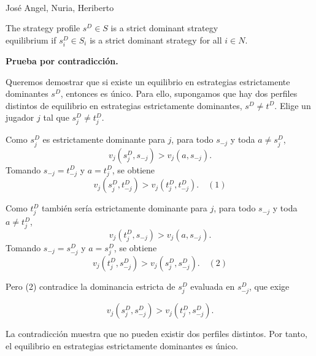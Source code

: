 \documentclass[10pt,a4paper]{article} %
\begin{document}
\thispagestyle{empty}
\vspace*{-5em}
\begin{center}
  \LARGE{}\\
  \vspace{0.5em}
  \scriptsize\textnormal{José Angel, Nuria, Heriberto}
  \vspace{2em}
\end{center}

\begin{center}
  The strategy profile $s^{D}\in S$ is a strict dominant strategy\\ equilibrium if $s_i^{D}\in S_i$ is a strict dominant strategy for all $i\in N$.
\end{center}


\vspace{2em}
\textbf{Prueba por contradicción.} 

Queremos demostrar que si existe un equilibrio en estrategias estrictamente dominantes $s^{D}$, entonces es único. Para ello, supongamos que hay dos perfiles distintos de equilibrio en estrategias estrictamente dominantes, $s^{D}\neq t^{D}$. Elige un jugador $j$ tal que $s^{D}_{j}\neq t^{D}_{j}$.

\vspace{2em}
Como $s^{D}_{j}$ es estrictamente dominante para $j$, para todo $s_{-j}$ y toda $a\neq s^{D}_{j}$, 
$$v_j(s^{D}_{j},s_{-j})>v_j(a,s_{-j}).$$ 
Tomando $s_{-j}=t_{-j}^{D}$ y $a=t^{D}_{j}$, se obtiene
$$v_j(s^{D}_{j},t^{D}_{-j})>v_j(t^{D}_{j},t^{D}_{-j}). \quad (1)$$

\vspace{2em}
Como $t^{D}_{j}$ también sería estrictamente dominante para $j$, para todo $s_{-j}$ y toda $a\neq t^{D}_{j}$,
$$
v_j(t^{D}_{j},s_{-j})>v_j(a,s_{-j}).
$$
Tomando $s_{-j}=s^{D}_{-j}$ y $a=s^{D}_{j}$, se obtiene
$$
v_j(t^{D}_{j},s^{D}_{-j})>v_j(s^{D}_{j},s^{D}_{-j}). \quad (2)
$$


\vspace{2em}
Pero (2) contradice la dominancia estricta de $s^{D}_{j}$ evaluada en $s^{D}_{-j}$, que exige

$$
v_j(s^{D}_{j},s^{D}_{-j})>v_j(t^{D}_{j},s^{D}_{-j}).
$$

\vspace{2em}
La contradicción muestra que no pueden existir dos perfiles distintos. Por tanto, el equilibrio en estrategias estrictamente dominantes es único.
\end{document}
